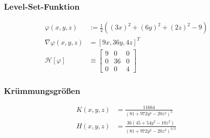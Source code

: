     \subsubsection{Level-Set-Funktion}
      \begin{align}
        \varphi(x,y,z) &:= \frac{1}{2}\left( (3x)^{2} + (6y)^{2} + (2z)^{2} - 9 \right) \\
        \nabla\varphi(x,y,z) &= \left[ 9x, 36y, 4z \right]^{T} \\
        \mathcal{H}[\varphi] &\equiv \begin{bmatrix} 9 & 0 & 0 \\
                                             0 & 36 & 0 \\
                                             0 & 0 & 4 \end{bmatrix}
      \end{align}

     \subsubsection{Krümmungsgrößen}
      \begin{align}
        K(x,y,z) &= \frac{11664}{(81+972y^{2}-20z^{2})^{2}} \\
        H(x,y,z) &= \frac{36 \left(45+54 y^2-10 z^2\right)}{\left(81+972 y^2-20 z^2\right)^{3/2}}
      \end{align}
